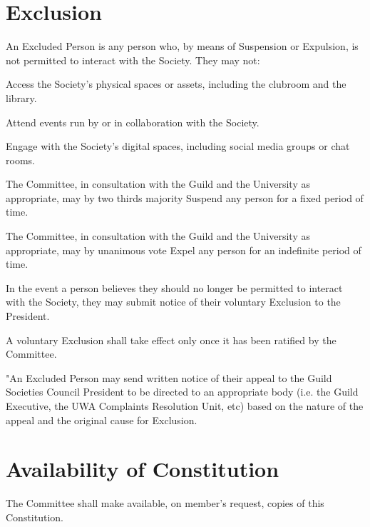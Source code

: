 \documentclass[a4paper]{article}
\begin{document}
\section{Exclusion} \label{sec:exclusion}
\begin{myEnumerate}
    \item An Excluded Person is any person who, by means of Suspension or Expulsion, is not permitted to interact with the Society. They may not:
          \begin{myEnumerate}
              \item Access the Society’s physical spaces or assets, including the clubroom and the library.
              \item Attend events run by or in collaboration with the Society.
              \item Engage with the Society’s digital spaces, including social media groups or chat rooms.
          \end{myEnumerate}
    \item The Committee, in consultation with the Guild and the University as appropriate, may by two thirds majority Suspend any person for a fixed period of time.
    \item The Committee, in consultation with the Guild and the University as appropriate, may by unanimous vote Expel any person for an indefinite period of time.
    \item In the event a person believes they should no longer be permitted to interact with the Society, they may submit notice of their voluntary Exclusion to the President.
          \begin{myEnumerate}
              \item A voluntary Exclusion shall take effect only once it has been ratified by the Committee.
          \end{myEnumerate}
    \item "An Excluded Person may send written notice of their appeal to the Guild Societies Council President to be directed to an appropriate body (i.e. the Guild Executive, the UWA Complaints Resolution Unit, etc) based on the nature of the appeal and the original cause for Exclusion.
\end{myEnumerate}


\section{Availability of Constitution} \label{sec:availability}
\begin{myEnumerate}
    \item The Committee shall make available, on member's request, copies of this Constitution.
\end{myEnumerate}
\end{document}
